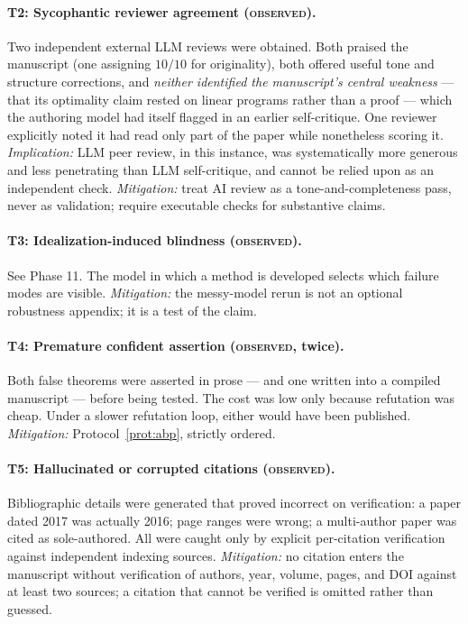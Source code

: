 \documentclass[11pt]{article}
\theoremstyle{remark}
\begin{document}
\paragraph{T2: Sycophantic reviewer agreement (\textsc{observed}).}
Two independent external LLM reviews were obtained. Both praised the manuscript (one assigning $10/10$ for originality), both offered useful tone and structure corrections, and \emph{neither identified the manuscript's central weakness} --- that its optimality claim rested on linear programs rather than a proof --- which the authoring model had itself flagged in an earlier self-critique. One reviewer explicitly noted it had read only part of the paper while nonetheless scoring it. \emph{Implication:} LLM peer review, in this instance, was systematically more generous and less penetrating than LLM self-critique, and cannot be relied upon as an independent check. \emph{Mitigation:} treat AI review as a tone-and-completeness pass, never as validation; require executable checks for substantive claims.

\paragraph{T3: Idealization-induced blindness (\textsc{observed}).}
See Phase 11. The model in which a method is developed selects which failure modes are visible. \emph{Mitigation:} the messy-model rerun is not an optional robustness appendix; it is a test of the claim.

\paragraph{T4: Premature confident assertion (\textsc{observed}, twice).}
Both false theorems were asserted in prose --- and one written into a compiled manuscript --- before being tested. The cost was low only because refutation was cheap. Under a slower refutation loop, either would have been published. \emph{Mitigation:} Protocol~\ref{prot:abp}, strictly ordered.

\paragraph{T5: Hallucinated or corrupted citations (\textsc{observed}).}
Bibliographic details were generated that proved incorrect on verification: a paper dated 2017 was actually 2016; page ranges were wrong; a multi-author paper was cited as sole-authored. All were caught only by explicit per-citation verification against independent indexing sources. \emph{Mitigation:} no citation enters the manuscript without verification of authors, year, volume, pages, and DOI against at least two sources; a citation that cannot be verified is omitted rather than guessed.
\end{document}
